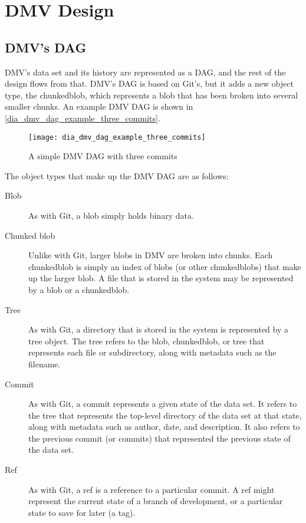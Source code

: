 \chapter{DMV Design}


\section{DMV's DAG}

DMV's data set and its history are represented as a DAG, and the rest of the
design flows from that. DMV's DAG is based on Git's, but it adds a new object
type, the \gls{chunkedblob}, which represents a \gls{blob} that has been broken
into several smaller chunks. An example DMV DAG is shown in
\autoref{dia_dmv_dag_example_three_commits}.

\begin{figure}[]
    \centering
    \texttt{[image: dia\_dmv\_dag\_example\_three\_commits]}
    \caption{A simple DMV DAG with three commits}
    \label{dia_dmv_dag_example_three_commits}
\end{figure}

The object types that make up the DMV DAG are as follows:

\begin{description}

    \item[Blob] As with Git, a \gls{blob} simply holds binary data.

    \item[Chunked blob] Unlike with Git, larger \glspl{blob} in DMV are
        broken into chunks. Each \gls{chunkedblob} is simply an index of
        \glspl{blob} (or other \glspl{chunkedblob}) that make up the larger
        \gls{blob}. A file that is stored in the system may be represented by a
        \gls{blob} or a \gls{chunkedblob}.

    \item[Tree] As with Git, a directory that is stored in the system is
        represented by a \gls{tree} object. The \gls{tree} refers to the
        \gls{blob}, \gls{chunkedblob}, or \gls{tree} that represents each file
        or subdirectory, along with metadata such as the filename.

    \item[Commit] As with Git, a \gls{commit} represents a given state of the
        data set. It refers to the \gls{tree} that represents the top-level
        directory of the data set at that state, along with metadata such as
        author, date, and description. It also refers to the previous
        \gls{commit} (or \glspl{commit}) that represented the previous state of
        the data set.

    \item[Ref] As with Git, a ref is a reference to a particular \gls{commit}. A
        ref might represent the current state of a branch of development, or a
        particular state to save for later (a tag).

\end{description}

